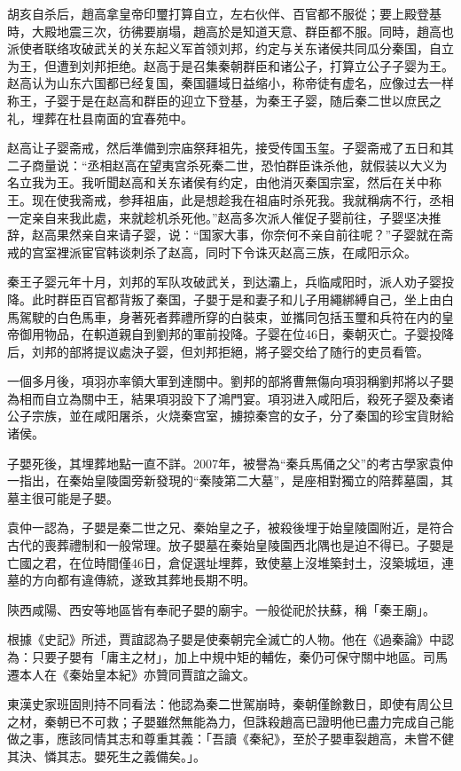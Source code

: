 胡亥自杀后，趙高拿皇帝印璽打算自立，左右伙伴、百官都不服從；要上殿登基時，大殿地震三次，彷彿要崩塌，趙高於是知道天意、群臣都不服。同時，趙高也派使者联络攻破武关的关东起义军首领刘邦，约定与关东诸侯共同瓜分秦国，自立为王，但遭到刘邦拒绝。赵高于是召集秦朝群臣和诸公子，打算立公子子婴为王。赵高认为山东六国都已经复国，秦国疆域日益缩小，称帝徒有虚名，应像过去一样称王，子婴于是在赵高和群臣的迎立下登基，为秦王子婴，随后秦二世以庶民之礼，埋葬在杜县南面的宜春苑中。

赵高让子婴斋戒，然后準備到宗庙祭拜祖先，接受传国玉玺。子婴斋戒了五日和其二子商量说：“丞相赵高在望夷宫杀死秦二世，恐怕群臣诛杀他，就假装以大义为名立我为王。我听聞赵高和关东诸侯有约定，由他消灭秦国宗室，然后在关中称王。现在使我斋戒，参拜祖庙，此是想趁我在祖庙时杀死我。我就稱病不行，丞相一定亲自来我此處，来就趁机杀死他。”赵高多次派人催促子婴前往，子婴坚决推辞，赵高果然亲自来请子婴，说：“国家大事，你奈何不亲自前往呢？”子婴就在斋戒的宫室裡派宦官韩谈刺杀了赵高，同时下令诛灭赵高三族，在咸阳示众。

秦王子婴元年十月，刘邦的军队攻破武关，到达灞上，兵临咸阳时，派人劝子婴投降。此时群臣百官都背叛了秦国，子嬰于是和妻子和儿子用繩綁縛自己，坐上由白馬駕駛的白色馬車，身著死者葬禮所穿的白裝束，並攜同包括玉璽和兵符在内的皇帝御用物品，在軹道親自到劉邦的軍前投降。子婴在位46日，秦朝灭亡。子婴投降后，刘邦的部將提议處決子婴，但刘邦拒絕，將子婴交给了随行的吏员看管。

一個多月後，項羽亦率領大軍到達關中。劉邦的部將曹無傷向項羽稱劉邦將以子嬰為相而自立為關中王，結果項羽設下了鴻門宴。項羽进入咸阳后，殺死子婴及秦诸公子宗族，並在咸阳屠杀，火烧秦宫室，擄掠秦宫的女子，分了秦国的珍宝貨財給诸侯。

子嬰死後，其埋葬地點一直不詳。2007年，被譽為“秦兵馬俑之父”的考古學家袁仲一指出，在秦始皇陵園旁新發現的“秦陵第二大墓”，是座相對獨立的陪葬墓園，其墓主很可能是子嬰。

袁仲一認為，子嬰是秦二世之兄、秦始皇之子，被殺後埋于始皇陵園附近，是符合古代的喪葬禮制和一般常理。放子嬰墓在秦始皇陵園西北隅也是迫不得已。子嬰是亡國之君，在位時間僅46日，倉促選址埋葬，致使墓上沒堆築封土，沒築城垣，連墓的方向都有違傳統，遂致其葬地長期不明。

陝西咸陽、西安等地區皆有奉祀子嬰的廟宇。一般從祀於扶蘇，稱「秦王廟」。

根據《史記》所述，賈誼認為子嬰是使秦朝完全滅亡的人物。他在《過秦論》中認為：只要子嬰有「庸主之材」，加上中規中矩的輔佐，秦仍可保守關中地區。司馬遷本人在《秦始皇本紀》亦贊同賈誼之論文。

東漢史家班固則持不同看法：他認為秦二世駕崩時，秦朝僅餘數日，即使有周公旦之材，秦朝已不可救；子嬰雖然無能為力，但誅殺趙高已證明他已盡力完成自己能做之事，應該同情其志和尊重其義：「吾讀《秦紀》，至於子嬰車裂趙高，未嘗不健其決、憐其志。嬰死生之義備矣。」。

